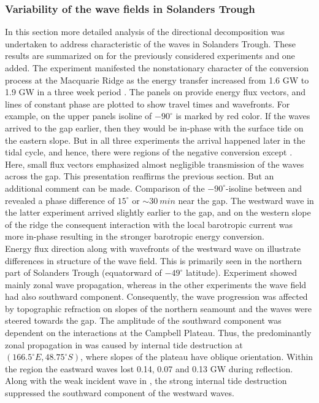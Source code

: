 \documentclass[12pt]{article}
\begin{document}
\subsubsection{Variability of the wave fields in Solanders Trough}
\label{C3.sec:3d_var}
In this section more detailed analysis of the directional decomposition was 
undertaken to address characteristic of the waves in Solanders Trough. These results are summarized 
on 
 for the previously considered 
experiments and one added. The experiment  manifested the nonstationary 
character of the conversion process at the Macquarie Ridge as the energy transfer increased from 
1.6 GW to 1.9 GW in a three week period . The panels on 
provide energy flux vectors, and lines of constant phase are plotted to show travel times and  
wavefronts. For example, on the upper panels isoline of $-90^{\circ}$ is marked by red color. If 
the 
waves arrived to the gap earlier, then they would be in-phase with the surface tide on the eastern 
slope. But in all three experiments the arrival 
happened later in the tidal cycle, and hence, there were regions of the negative conversion except 
. Here, small flux vectors emphasized almost negligible transmission 
of the waves across the gap. This presentation reaffirms the previous section. But an 
additional comment can be made. Comparison of the $-90^{\circ}$-isoline between  and 
 revealed a phase difference of $15^{\circ}$ or $\sim30~min$ near the gap. The westward 
wave in the latter experiment arrived slightly earlier to the gap, and on the western slope of the 
ridge the consequent interaction with the local barotropic current was more in-phase resulting in 
the stronger barotropic energy conversion.\\

Energy flux direction along with wavefronts of the westward wave on 
 illustrate differences in structure of the wave field. This is 
primarily seen in the northern part of Solanders Trough (equatorward of $-49^{\circ}$ latitude). 
Experiment 
 showed mainly zonal wave propagation, whereas in the other experiments the wave field  
had also southward component. Consequently, the wave progression was affected by topographic 
refraction on slopes of the northern seamount and the waves were steered towards the gap. The 
amplitude 
of the southward component was dependent on the interactions at the Campbell Plateau. 
Thus, the predominantly zonal propagation in  was caused by internal 
tide 
destruction at $(166.5^{\circ}E, 48.75^{\circ}S)$,  where 
slopes of the plateau have oblique orientation. Within the region the eastward waves lost 
0.14, 0.07 and 0.13 GW during reflection. Along 
with the weak incident wave  in , the strong internal tide 
destruction suppressed the southward component of the westward waves.\\
\end{document}
